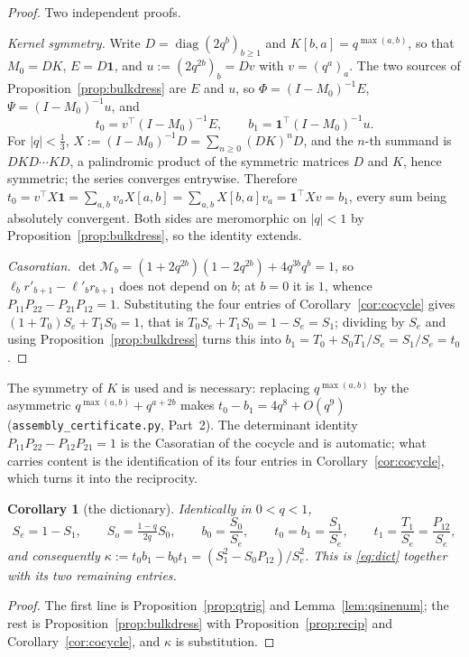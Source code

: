 \documentclass[11pt]{article}
\theoremstyle{plain}
\newtheorem{corollary}[theorem]{Corollary}
\theoremstyle{definition}
\theoremstyle{remark}
\begin{document}
\begin{proof}
Two independent proofs.

\emph{Kernel symmetry.} Write $D=\operatorname{diag}(2q^b)_{b\ge1}$ and $K[b,a]=q^{\max(a,b)}$, so
that $M_0=DK$, $E=D\mathbf 1$, and $u:=(2q^{2b})_b=Dv$ with $v=(q^a)_a$. The two sources of
Proposition~\ref{prop:bulkdress} are $E$ and $u$, so $\Phi=(I-M_0)^{-1}E$, $\Psi=(I-M_0)^{-1}u$,
and
\[
   t_0=v^{\!\top}(I-M_0)^{-1}E,\qquad b_1=\mathbf 1^{\!\top}(I-M_0)^{-1}u .
\]
For $|q|<\tfrac13$, $X:=(I-M_0)^{-1}D=\sum_{n\ge0}(DK)^nD$, and the $n$-th summand is
$DKD\cdots KD$, a palindromic product of the symmetric matrices $D$ and $K$, hence symmetric; the
series converges entrywise. Therefore
$t_0=v^{\!\top}X\mathbf 1=\sum_{a,b}v_aX[a,b]=\sum_{a,b}X[b,a]v_a=\mathbf 1^{\!\top}Xv=b_1$, every
sum being absolutely convergent. Both sides are meromorphic on $|q|<1$ by
Proposition~\ref{prop:bulkdress}, so the identity extends.

\emph{Casoratian.} $\det\mathcal M_b=(1+2q^{2b})(1-2q^{2b})+4q^{3b}q^b=1$, so
$\ell_br'_{b+1}-\ell'_br_{b+1}$ does not depend on $b$; at $b=0$ it is $1$, whence
$P_{11}P_{22}-P_{21}P_{12}=1$. Substituting the four entries of Corollary~\ref{cor:cocycle} gives
$(1+T_0)S_e+T_1S_0=1$, that is $T_0S_e+T_1S_0=1-S_e=S_1$; dividing by $S_e$ and using
Proposition~\ref{prop:bulkdress} turns this into $b_1=T_0+S_0T_1/S_e=S_1/S_e=t_0$.
\end{proof}

\noindent The symmetry of $K$ is used and is necessary: replacing $q^{\max(a,b)}$ by the
asymmetric $q^{\max(a,b)}+q^{a+2b}$ makes $t_0-b_1=4q^{8}+O(q^{9})$
(\texttt{assembly\_certificate.py}, Part~2). The determinant identity
$P_{11}P_{22}-P_{12}P_{21}=1$ is the Casoratian of the cocycle and is automatic; what carries
content is the identification of its four entries in Corollary~\ref{cor:cocycle}, which turns it
into the reciprocity.

\begin{corollary}[the dictionary]\label{cor:dict}
Identically in $0<q<1$,
\[
  S_e=1-S_1,\qquad S_o=\tfrac{1-q}{2q}S_0,\qquad b_0=\frac{S_0}{S_e},\qquad
  t_0=b_1=\frac{S_1}{S_e},\qquad t_1=\frac{T_1}{S_e}=\frac{P_{12}}{S_e},
\]
and consequently $\kappa:=t_0b_1-b_0t_1=(S_1^2-S_0P_{12})/S_e^2$. This is \eqref{eq:dict} together
with its two remaining entries.
\end{corollary}

\begin{proof}
The first line is Proposition~\ref{prop:qtrig} and Lemma~\ref{lem:qsinenum}; the rest is
Proposition~\ref{prop:bulkdress} with Proposition~\ref{prop:recip} and
Corollary~\ref{cor:cocycle}, and $\kappa$ is substitution.
\end{proof}
\end{document}
